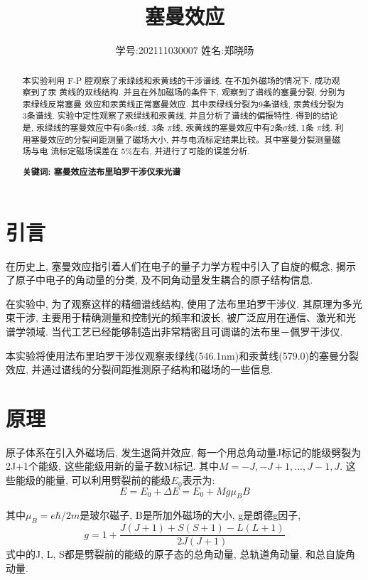 \documentclass[12pt,a4paper]{article}
\title{\vspace{-4cm}\Large 塞曼效应}  %
\author{\kaishu 学号:202111030007 \hspace{2cm} 姓名:郑晓旸}   %
\date{}
\begin{document}
\maketitle

\begin{abstract}
    本实验利用 F-P 腔观察了汞绿线和汞黄线的干涉谱线. 在不加外磁场的情况下, 成功观察到了汞
黄线的双线结构. 
并且在外加磁场的条件下, 观察到了谱线的塞曼分裂, 分别为汞绿线反常塞曼
效应和汞黄线正常塞曼效应. 其中汞绿线分裂为9条谱线, 汞黄线分裂为3条谱线. 
实验中定性观察了汞绿线和汞黄线, 并且分析了谱线的偏振特性. 得到的结论是, 汞绿线的塞曼效应中有6条$\sigma$线, 3条
$\pi$线, 汞黄线的塞曼效应中有2条$\sigma$线, 1条
$\pi$线. 利用塞曼效应的分裂间距测量了磁场大小, 并与电流标定结果比较。其中塞曼分裂测量磁场与电
流标定磁场误差在 5\%左右, 并进行了可能的误差分析. 


\bf{关键词: 塞曼效应\quad 法布里珀罗干涉仪\quad 汞光谱}
\end{abstract}

\section{引言}

在历史上, 塞曼效应指引着人们在电子的量子力学方程中引入了自旋的概念, 揭示了原子中电子的角动量的分类, 及不同角动量发生耦合的原子结构信息. 

在实验中, 为了观察这样的精细谱线结构, 使用了法布里珀罗干涉仪. 其原理为多光束干涉, 主要用于精确测量和控制光的频率和波长, 被广泛应用在通信、激光和光谱学领域. 
当代工艺已经能够制造出非常精密且可调谐的法布里－佩罗干涉仪. 

本实验将使用法布里珀罗干涉仪观察汞绿线(546.1nm)和汞黄线(579.0)的塞曼分裂效应, 并通过谱线的分裂间距推测原子结构和磁场的一些信息. 


\section{原理}
原子体系在引入外磁场后, 发生退简并效应, 每一个用总角动量J标记的能级劈裂为2J+1个能级, 这些能级用新的量子数M标记. 其中$M=-J,-J+1,...,J-1,J$. 
这些能级的能量, 可以利用劈裂前的能级$E_{0}$表示为: 
\begin{equation}
E=E_{0}+\Delta E=E_{0}+M g \mu_{B} B
\end{equation}

其中$\mu_B=e \hbar /2m$是玻尔磁子, B是所加外磁场的大小, g是朗德g因子, 
\begin{equation}
g=1+\frac{J(J+1)+S(S+1)-L(L+1)}{2J(J+1)}
\end{equation}
式中的J, L, S都是劈裂前的能级的原子态的总角动量, 总轨道角动量, 和总自旋角动量. 
\end{document}

